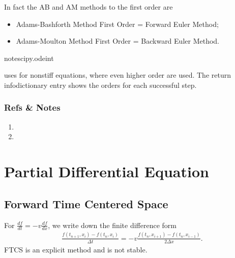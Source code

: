 \documentclass[letterpaper,12pt,english]{sphinxmanual}
\begin{document}
In fact the AB and AM methods to the first order are
\begin{itemize}
\item {} 
Adams-Bashforth Method First Order = Forward Euler Method;

\item {} 
Adams-Moulton Method First Order = Backward Euler Method.

\end{itemize}

\begin{sphinxadmonition}{note}{scipy.odeint}

 uses  for nonstiff equations, where even higher order are used. The return infodictionary entry  shows the orders for each successful step.
\end{sphinxadmonition}


\subsubsection{Refs \& Notes}
\label{\detokenize{finite-difference/ode/adams:refs-notes}}\begin{enumerate}
\item {} 

\item {} 

\end{enumerate}


\section{Partial Differential Equation}
\label{\detokenize{finite-difference/pde/index::doc}}\label{\detokenize{finite-difference/pde/index:partial-differential-equation}}

\subsection{Forward Time Centered Space}
\label{\detokenize{finite-difference/pde/index:forward-time-centered-space}}
For \(\frac{d f}{d t} = - v \frac{ d f }{ dx }\), we write down the finite difference form \label{\detokenize{finite-difference/pde/index:id1}}{\hyperref[\detokenize{finite-difference/pde/index:numericalrecipes}]{\sphinxcrossref{{[}NumericalRecipes{]}}}}
\begin{equation*}
\begin{split}\frac{f(t_{n+1}, x_i ) - f(t_n, x_i)}{ \Delta t } = - v \frac{ f(t_n, x_{i+1}) - f(t_n, x_{i-1}) }{ 2\Delta x }.\end{split}
\end{equation*}
FTCS is an explicit method and is not stable.
\end{document}
